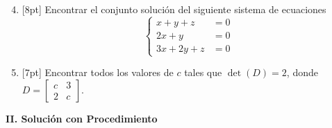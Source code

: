 \documentclass[11pt]{article}
\begin{document}
\newpage
\begin{enumerate}
\setcounter{enumi}{3}
\item{}[8pt] Encontrar el conjunto solución del siguiente sistema de ecuaciones
\[
\left\{
\begin{aligned}
x+y+z &=0\\
2x+y &=0\\
3x+2y+z &=0
\end{aligned}
\right.
\]

\vspace{4pt}
\fbox{\begin{minipage}[t][2.3cm]{\dimexpr\linewidth-2\fboxsep-2\fboxrule}
\phantom{x}
\end{minipage}}

\item{}[7pt] Encontrar todos los valores de $c$ tales que $\det(D)=2$, donde $D = \begin{bmatrix}c&3\\2&c\end{bmatrix}$.

\vspace{4pt}
\end{enumerate}

\vspace{6pt}
\begin{center}\textbf{II. Solución con Procedimiento}\end{center}
\end{document}
